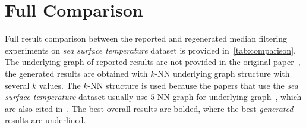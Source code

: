\documentclass[a4paper, 10pt]{article}
\begin{document}
\section{Full Comparison}
Full result comparison between the reported and regenerated median filtering experiments on \textit{sea surface temperature} dataset is provided in~\cref{tab:comparison}. The underlying graph of reported results are not provided in the original paper~\cite{median}, the generated results are obtained with \(k\)-NN underlying graph structure with several \(k\) values. The \(k\)-NN structure is used because the papers that use the \textit{sea surface temperature} dataset usually use \(5\)-NN graph for underlying graph~\cite{reconstruction,sobolev}, which are also cited in~\cite{median}. The best overall results are bolded, where the best \textit{generated} results are underlined.
\end{document}
